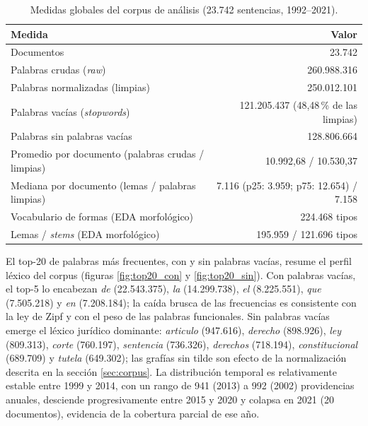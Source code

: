 \documentclass[11pt]{tg_usta}
\begin{document}
\begin{table}[htbp]
    \centering
    \caption{Medidas globales del corpus de análisis (23.742 sentencias, 1992--2021).}
    \label{tab:medidas}
    \begin{tabular}{lr}
        \toprule
        \textbf{Medida} & \textbf{Valor} \\
        \midrule
        Documentos & 23.742 \\
        Palabras crudas (\emph{raw}) & 260.988.316 \\
        Palabras normalizadas (limpias) & 250.012.101 \\
        Palabras vacías (\emph{stopwords}) & 121.205.437 (48,48\,\% de las limpias) \\
        Palabras sin palabras vacías & 128.806.664 \\
        Promedio por documento (palabras crudas / limpias) & 10.992,68 / 10.530,37 \\
        Mediana por documento (lemas / palabras limpias) & 7.116 (p25: 3.959; p75: 12.654) / 7.158 \\
        Vocabulario de formas (EDA morfológico) & 224.468 tipos \\
        Lemas / \emph{stems} (EDA morfológico) & 195.959 / 121.696 tipos \\
        \bottomrule
    \end{tabular}
\end{table}

El top-20 de palabras más frecuentes, con y sin palabras vacías, resume el perfil léxico del corpus (figuras \ref{fig:top20_con} y \ref{fig:top20_sin}). Con palabras vacías, el top-5 lo encabezan \emph{de} (22.543.375), \emph{la} (14.299.738), \emph{el} (8.225.551), \emph{que} (7.505.218) y \emph{en} (7.208.184); la caída brusca de las frecuencias es consistente con la ley de Zipf y con el peso de las palabras funcionales. Sin palabras vacías emerge el léxico jurídico dominante: \emph{articulo} (947.616), \emph{derecho} (898.926), \emph{ley} (809.313), \emph{corte} (760.197), \emph{sentencia} (736.326), \emph{derechos} (718.194), \emph{constitucional} (689.709) y \emph{tutela} (649.302); las grafías sin tilde son efecto de la normalización descrita en la sección \ref{sec:corpus}. La distribución temporal es relativamente estable entre 1999 y 2014, con un rango de 941 (2013) a 992 (2002) providencias anuales, desciende progresivamente entre 2015 y 2020 y colapsa en 2021 (20 documentos), evidencia de la cobertura parcial de ese año.
\end{document}
